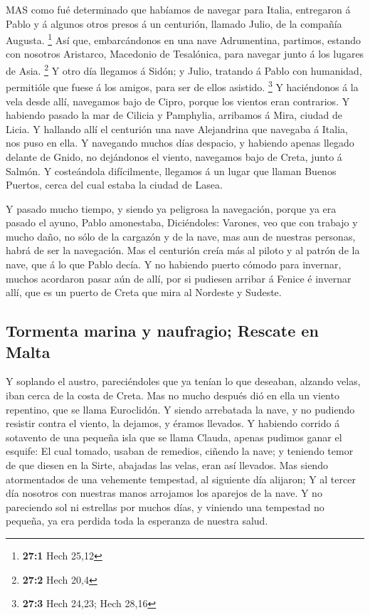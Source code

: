  MAS como fué determinado que habíamos de navegar para
Italia, entregaron á Pablo y á algunos otros presos á un centurión,
llamado Julio, de la compañía Augusta. \footnote{\textbf{27:1} Hech
  25,12}  Así que, embarcándonos en una nave Adrumentina,
partimos, estando con nosotros Aristarco, Macedonio de Tesalónica, para
navegar junto á los lugares de Asia. \footnote{\textbf{27:2} Hech 20,4}
 Y otro día llegamos á Sidón; y Julio, tratando á Pablo con
humanidad, permitióle que fuese á los amigos, para ser de ellos
asistido. \footnote{\textbf{27:3} Hech 24,23; Hech 28,16}  Y
haciéndonos á la vela desde allí, navegamos bajo de Cipro, porque los
vientos eran contrarios.  Y habiendo pasado la mar de
Cilicia y Pamphylia, arribamos á Mira, ciudad de Licia.  Y
hallando allí el centurión una nave Alejandrina que navegaba á Italia,
nos puso en ella.  Y navegando muchos días despacio, y
habiendo apenas llegado delante de Gnido, no dejándonos el viento,
navegamos bajo de Creta, junto á Salmón.  Y costeándola
difícilmente, llegamos á un lugar que llaman Buenos Puertos, cerca del
cual estaba la ciudad de Lasea.

 Y pasado mucho tiempo, y siendo ya peligrosa la navegación,
porque ya era pasado el ayuno, Pablo amonestaba, 
Diciéndoles: Varones, veo que con trabajo y mucho daño, no sólo de la
cargazón y de la nave, mas aun de nuestras personas, habrá de ser la
navegación.  Mas el centurión creía más al piloto y al
patrón de la nave, que á lo que Pablo decía.  Y no habiendo
puerto cómodo para invernar, muchos acordaron pasar aún de allí, por si
pudiesen arribar á Fenice é invernar allí, que es un puerto de Creta que
mira al Nordeste y Sudeste.

\hypertarget{tormenta-marina-y-naufragio-rescate-en-malta}{%
\subsection{Tormenta marina y naufragio; Rescate en
Malta}\label{tormenta-marina-y-naufragio-rescate-en-malta}}

 Y soplando el austro, pareciéndoles que ya tenían lo que
deseaban, alzando velas, iban cerca de la costa de Creta. 
Mas no mucho después dió en ella un viento repentino, que se llama
Euroclidón.  Y siendo arrebatada la nave, y no pudiendo
resistir contra el viento, la dejamos, y éramos llevados. 
Y habiendo corrido á sotavento de una pequeña isla que se llama Clauda,
apenas pudimos ganar el esquife:  El cual tomado, usaban de
remedios, ciñendo la nave; y teniendo temor de que diesen en la Sirte,
abajadas las velas, eran así llevados.  Mas siendo
atormentados de una vehemente tempestad, al siguiente día alijaron;
 Y al tercer día nosotros con nuestras manos arrojamos los
aparejos de la nave.  Y no pareciendo sol ni estrellas por
muchos días, y viniendo una tempestad no pequeña, ya era perdida toda la
esperanza de nuestra salud.

